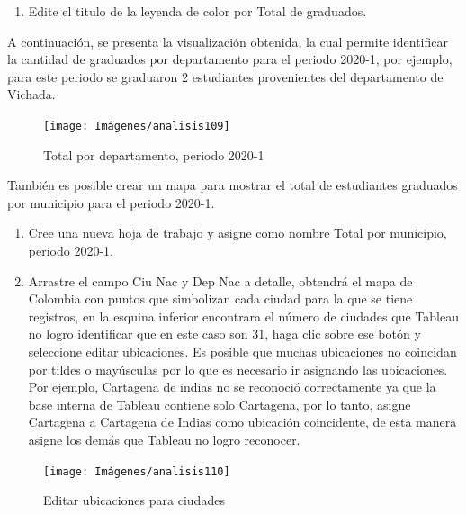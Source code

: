 \documentclass[
]{book}
\providecommand{\tightlist}{%
  \setlength{\itemsep}{0pt}\setlength{\parskip}{0pt}}
\begin{document}
\begin{enumerate}
\def\labelenumi{\arabic{enumi}.}
\setcounter{enumi}{7}
\tightlist
\item
  Edite el titulo de la leyenda de color por Total de graduados.
\end{enumerate}

A continuación, se presenta la visualización obtenida, la cual permite identificar la cantidad de graduados por departamento para el periodo 2020-1, por ejemplo, para este periodo se graduaron 2 estudiantes provenientes del departamento de Vichada.

\begin{figure}

{\centering \texttt{[image: Imágenes/analisis109]} 

}

\caption{Total por departamento, periodo 2020-1}\label{fig:mapeodepartamentos-fig}
\end{figure}

También es posible crear un mapa para mostrar el total de estudiantes graduados por municipio para el periodo 2020-1.

\begin{enumerate}
\def\labelenumi{\arabic{enumi}.}
\item
  Cree una nueva hoja de trabajo y asigne como nombre Total por municipio, periodo 2020-1.
\item
  Arrastre el campo Ciu Nac y Dep Nac a detalle, obtendrá el mapa de Colombia con puntos que simbolizan cada ciudad para la que se tiene registros, en la esquina inferior encontrara el número de ciudades que Tableau no logro identificar que en este caso son 31, haga clic sobre ese botón y seleccione editar ubicaciones. Es posible que muchas ubicaciones no coincidan por tildes o mayúsculas por lo que es necesario ir asignando las ubicaciones. Por ejemplo, Cartagena de indias no se reconoció correctamente ya que la base interna de Tableau contiene solo Cartagena, por lo tanto, asigne Cartagena a Cartagena de Indias como ubicación coincidente, de esta manera asigne los demás que Tableau no logro reconocer.
\end{enumerate}

\begin{figure}

{\centering \texttt{[image: Imágenes/analisis110]} 

}

\caption{Editar ubicaciones para ciudades}\label{fig:paso2mapeomunicipios-fig}
\end{figure}
\end{document}
